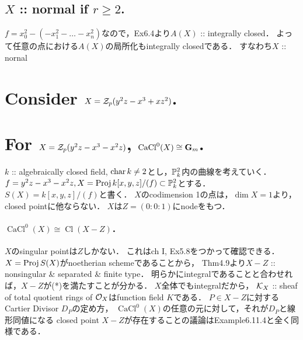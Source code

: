 \documentclass[a4paper]{jsarticle}
\newcommand{\Cl}{\operatorname{Cl}}
\newcommand{\nullCaCl}{\operatorname{CaCl}^{0}}
\begin{document}
    \subsection{$X$ :: normal if $r \geq 2$.}
    $f=x_0^2-(-x_1^2-\dots-x_n^2)$なので，Ex6.4より$A(X)$ :: integrally closed．
    よって任意の点における$A(X)$の局所化もintegrally closedである．
    すなわち$X$ :: nornal

\section{Consider $X=\mathcal{Z}_p(y^2z-x^3+xz^2)$.} %

\section{For $X=\mathcal{Z}_p(y^2z-x^3-x^2z)$, $\nullCaCl(X) \iso \mathbf{G}_m$.} %
    $k$ :: algebraically closed field, $\operatorname{char} k \neq 2$とし，$\mathbb{P}^2_k$内の曲線を考えていく．
    $f=y^2z-x^3-x^2z, X=\operatorname{Proj} k[x,y,z]/(f) \subset \mathbb{P}_k^2$とする．
    $S(X)=k[x,y,z]/(f)$と書く．
    $X$のcodimension 1の点は，$\dim X=1$より，closed pointに他ならない．
    $X$は$Z=(0:0:1)$にnodeをもつ．

    \paragraph{$\nullCaCl(X) \cong \Cl(X-Z)$．}
    $X$のsingular pointは$Z$しかない．
    これはch I, Ex5.8をつかって確認できる．
    $X=\operatorname{Proj} S(X)$がnoetherian schemeであることから，
    Thm4.9より$X-Z$ :: nonsingular \& separated \& finite type．
    明らかにintegralであることと合わせれば，$X-Z$が(*)を満たすことが分かる．
    $X$全体でもintegralだから，
    $\mathcal{K}_X$ :: sheaf of total quotient rings of $\mathcal{O}_X$はfunction field $K$である．
    $P \in X-Z$に対するCartier Divisor $D_P$の定め方，
    $\nullCaCl(X)$の任意の元に対して，それが$D_P$と線形同値になる
    closed point $X-Z$が存在することの議論はExample6.11.4と全く同様である．
\end{document}
